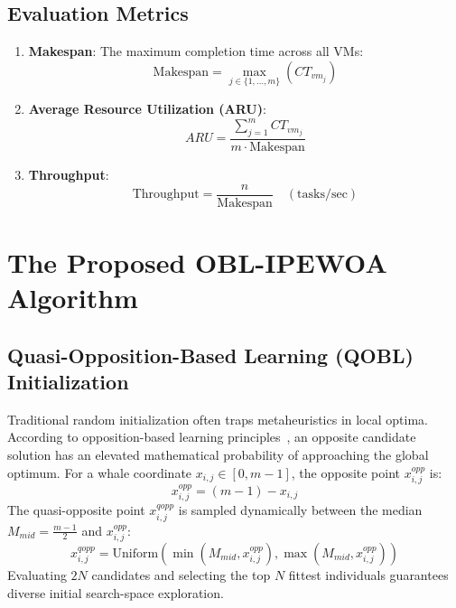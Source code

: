 \documentclass[journal]{IEEEtran}
\begin{document}
\subsection{Evaluation Metrics}
\begin{enumerate}
    \item \textbf{Makespan}: The maximum completion time across all VMs:
    \begin{equation}
    \text{Makespan} = \max_{j \in \{1,\dots,m\}} (CT_{vm_j})
    \end{equation}
    \item \textbf{Average Resource Utilization (ARU)}:
    \begin{equation}
    ARU = \frac{\sum_{j=1}^m CT_{vm_j}}{m \cdot \text{Makespan}}
    \end{equation}
    \item \textbf{Throughput}:
    \begin{equation}
    \text{Throughput} = \frac{n}{\text{Makespan}} \quad (\text{tasks/sec})
    \end{equation}
\end{enumerate}

\section{The Proposed OBL-IPEWOA Algorithm}
\subsection{Quasi-Opposition-Based Learning (QOBL) Initialization}
Traditional random initialization often traps metaheuristics in local optima. According to opposition-based learning principles~\cite{tizhoosh2005opposition}, an opposite candidate solution has an elevated mathematical probability of approaching the global optimum.
For a whale coordinate $x_{i,j} \in [0, m-1]$, the opposite point $x_{i,j}^{opp}$ is:
\begin{equation}
x_{i,j}^{opp} = (m - 1) - x_{i,j}
\end{equation}
The quasi-opposite point $x_{i,j}^{qopp}$ is sampled dynamically between the median $M_{mid} = \frac{m-1}{2}$ and $x_{i,j}^{opp}$:
\begin{equation}
x_{i,j}^{qopp} = \text{Uniform}\left(\min(M_{mid}, x_{i,j}^{opp}), \max(M_{mid}, x_{i,j}^{opp})\right)
\end{equation}
Evaluating $2N$ candidates and selecting the top $N$ fittest individuals guarantees diverse initial search-space exploration.
\end{document}
